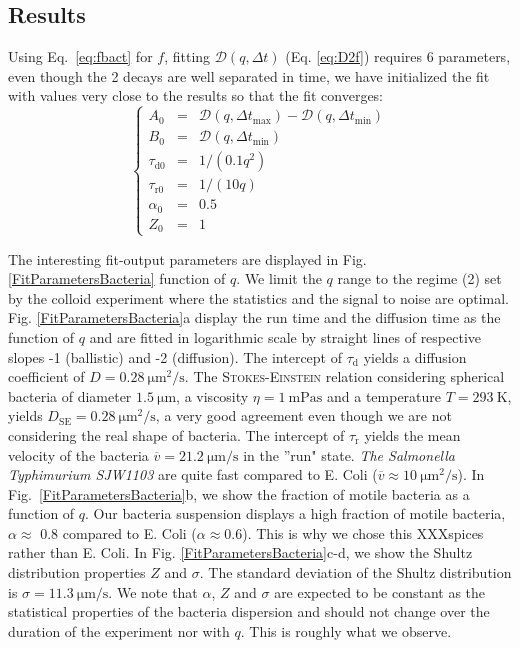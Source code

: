 \documentclass[%
 aip,
 jmp,%
 amsmath,amssymb,
reprint,%
]{revtex4-1}
\newcommand{\tg}[1]{{\color{magenta}#1}} %
\begin{document}
\subsection{Results}
Using Eq.~\eqref{eq:fbact} for $f$, fitting $\mathcal{D}(q, \Delta t)$ (Eq. \eqref{eq:D2f}) requires 6 parameters, even though the 2 decays are well separated in time, we have initialized the fit with values very close to the results so that the fit converges:
\begin{equation}
\left\{
\begin{array}{rcl}
A_0 &=& \mathcal{D} (q,\Delta t_\text{max}) - \mathcal{D} (q,\Delta t_\text{min}) \\
B_0 &=& \mathcal{D} (q,\Delta t_\text{min}) \\
\tau_\text{d0} &=& 1/(0.1 q^{2})\\
\tau_\text{r0} &=& 1/(10 q)\\
\alpha_0 &=& 0.5\\
Z_0 &=& 1
\end{array}
\right.
\end{equation}

The interesting fit-output parameters are displayed in Fig. \ref{FitParametersBacteria} function of $q$. We limit the $q$ range to the regime (2) set by the colloid experiment where the statistics and the signal to noise are optimal. \tg{Fig. \ref{FitParametersBacteria}a display the run time and the diffusion time as the function of $q$ and are fitted in logarithmic scale by straight lines of respective slopes -1 (ballistic) and -2 (diffusion). The intercept of $\tau_\text{d}$ yields a diffusion coefficient of  $D = \SI{0.28}{\micro\meter\squared\per\second}$. The \textsc{Stokes-Einstein} relation considering spherical bacteria of diameter $\SI{1.5}{\micro\meter}$, a viscosity $\eta = \SI{1}{\milli\pascal\second}$ and a temperature $T=\SI{293}{\kelvin}$, yields $D_\text{SE} = \SI{0.28}{\micro\meter\squared\per\second}$, a very good agreement even though we are not considering the real shape of bacteria. The intercept of $\tau_\text{r}$  yields the mean velocity of the bacteria $\overline{v} = \SI{21.2}{\micro\meter\per\second}$ in the ''run" state. \textit{The Salmonella Typhimurium SJW1103}  are quite fast compared to E. Coli ($\overline{v} \approx \SI{10}{\micro\meter\squared\per\second}$)\cite{4_Martinez20121637}. In Fig.~\ref{FitParametersBacteria}b, we show the fraction of motile bacteria as a function of $q$. Our bacteria suspension displays a high fraction of motile bacteria, $\alpha\approx$ 0.8 compared to E. Coli ($\alpha\approx 0.6$)\cite{4_Martinez20121637}. This is why we chose this XXXspices rather than  E. Coli. In Fig. \ref{FitParametersBacteria}c-d, we show the Shultz distribution properties $Z$ and $\sigma$. The standard deviation of the  Shultz distribution is $\sigma=\SI{11.3}{\micro\meter\per\second}$. We note that $\alpha$, $Z$ and $\sigma$ are expected to be constant as the statistical properties of the bacteria dispersion and should not change over the duration of the experiment nor with $q$. This is roughly what we observe.}
\end{document}
